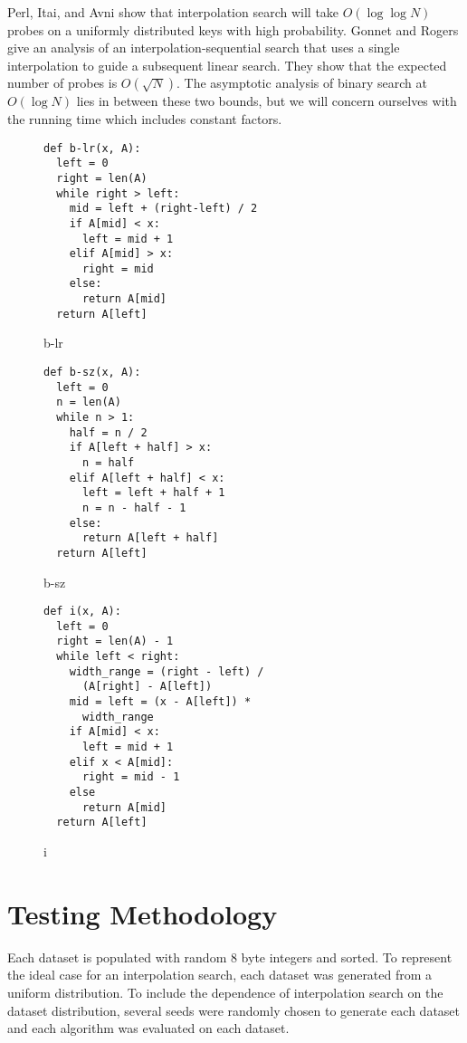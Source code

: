 \documentclass[twocolumn]{article}
\begin{document}
Perl, Itai, and Avni \cite{perl-itai-avni} show that interpolation search will take $O(\log \log N)$ probes on a uniformly distributed keys with high probability. Gonnet and Rogers \cite{gonnet-rogers} give an analysis of an interpolation-sequential search that uses a single interpolation to guide a subsequent linear search. They show that the expected number of probes is $O(\sqrt N)$. The asymptotic analysis of binary search at $O(\log N)$ lies in between these two bounds, but we will concern ourselves with the running time which includes constant factors.

\begin{figure}[ht]
\begin{verbatim}
def b-lr(x, A):
  left = 0
  right = len(A)
  while right > left:
    mid = left + (right-left) / 2
    if A[mid] < x:
      left = mid + 1
    elif A[mid] > x:
      right = mid 
    else:
      return A[mid]
  return A[left]
\end{verbatim}
\caption{b-lr}
  \label{b-lr-code}
\end{figure}

\begin{figure}[ht]
\begin{verbatim}
def b-sz(x, A):
  left = 0
  n = len(A)
  while n > 1:
    half = n / 2
    if A[left + half] > x:
      n = half
    elif A[left + half] < x:
      left = left + half + 1
      n = n - half - 1
    else:
      return A[left + half]
  return A[left]
\end{verbatim}
\caption{b-sz}
  \label{b-sz-code}
\end{figure}

\begin{figure}[ht]
\begin{verbatim}
def i(x, A):
  left = 0
  right = len(A) - 1
  while left < right:
    width_range = (right - left) /
      (A[right] - A[left])
    mid = left = (x - A[left]) *
      width_range
    if A[mid] < x:
      left = mid + 1
    elif x < A[mid]:
      right = mid - 1
    else
      return A[mid]
  return A[left]
\end{verbatim}
\caption{i}
  \label{i-code}
\end{figure}

\section{Testing Methodology}

Each dataset is populated with random 8 byte integers and sorted. To represent the ideal case for an interpolation search, each dataset was generated from a uniform distribution. To include the dependence of interpolation search on the dataset distribution, several seeds were randomly chosen to generate each dataset and each algorithm was evaluated on each dataset.
\end{document}
